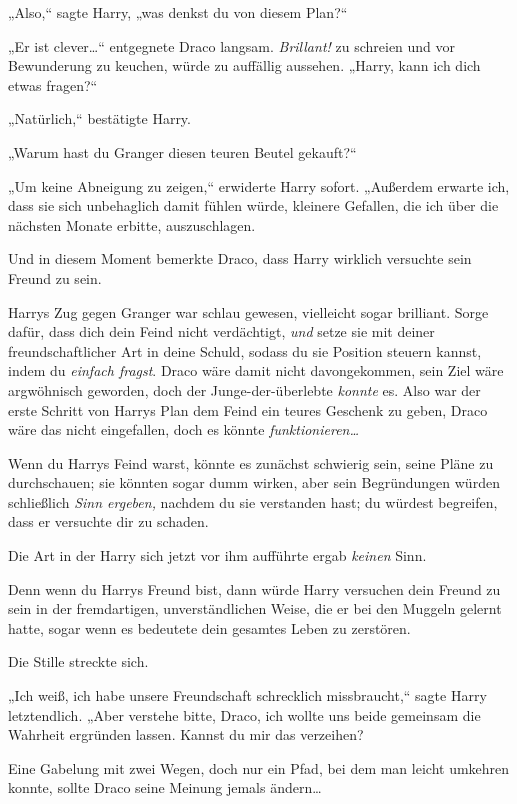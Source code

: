 {„Also,“ sagte Harry, „was denkst du von diesem Plan?“

„Er ist clever…“ entgegnete Draco langsam. \emph{Brillant!} zu schreien und vor Bewunderung zu keuchen, würde zu auffällig aussehen. „Harry, kann ich dich etwas fragen?“

„Natürlich,“ bestätigte Harry.

„Warum hast du Granger diesen teuren Beutel gekauft?“

„Um keine Abneigung zu zeigen,“ erwiderte Harry sofort. „Außerdem erwarte ich, dass sie sich unbehaglich damit fühlen würde, kleinere Gefallen, die ich über die nächsten Monate erbitte, auszuschlagen.

Und in diesem Moment bemerkte Draco, dass Harry wirklich versuchte sein Freund zu sein.

Harrys Zug gegen Granger war schlau gewesen, vielleicht sogar brilliant. Sorge dafür, dass dich dein Feind nicht verdächtigt, \emph{und} setze sie mit deiner freundschaftlicher Art in deine Schuld, sodass du sie Position steuern kannst, indem du \emph{einfach fragst}. Draco wäre damit nicht davongekommen, sein Ziel wäre argwöhnisch geworden, doch der Junge-der-überlebte \emph{konnte} es. Also war der erste Schritt von Harrys Plan dem Feind ein teures Geschenk zu geben, Draco wäre das nicht eingefallen, doch es könnte \emph{funktionieren…}

Wenn du Harrys Feind warst, könnte es zunächst schwierig sein, seine Pläne zu durchschauen; sie könnten sogar dumm wirken, aber sein Begründungen würden schließlich \emph{Sinn ergeben,} nachdem du sie verstanden hast; du würdest begreifen, dass er versuchte dir zu schaden.

Die Art in der Harry sich jetzt vor ihm aufführte ergab \emph{keinen} Sinn.

Denn wenn du Harrys Freund bist, dann würde Harry versuchen dein Freund zu sein in der fremdartigen, unverständlichen Weise, die er bei den Muggeln gelernt hatte, sogar wenn es bedeutete dein gesamtes Leben zu zerstören.

Die Stille streckte sich.

„Ich weiß, ich habe unsere Freundschaft schrecklich missbraucht,“ sagte Harry letztendlich. „Aber verstehe bitte, Draco, ich wollte uns beide gemeinsam die Wahrheit ergründen lassen. Kannst du mir das verzeihen?

Eine Gabelung mit zwei Wegen, doch nur ein Pfad, bei dem man leicht umkehren konnte, sollte Draco seine Meinung jemals ändern…

}
